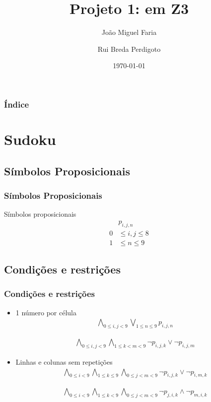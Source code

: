 \documentclass[a4paper,12pt]{beamer}
\title{Projeto 1: \sat em {Z3}}
\author{João Miguel Faria \and Rui Breda Perdigoto}
\date{\today}
\theoremstyle{definition}
\theoremstyle{theorem}
\theoremstyle{remark}
\begin{document}
\begin{frame}
   \titlepage
\end{frame}

\begin{frame}
   \frametitle{Índice}
   \tableofcontents%
\end{frame}

\section{Sudoku}

\subsection{Símbolos Proposicionais}
\begin{frame}
\frametitle{Símbolos Proposicionais}
Símbolos proposicionais 
   \begin{align*}
      &p_{i,j,n}\\
      0&\leq i, j \leq 8\\
      1&\leq n \leq 9
   \end{align*}
\end{frame}

\subsection{Condições e restrições}
\begin{frame}
\frametitle{Condições e restrições}
\begin{itemize}
     \item 1 número por célula
        \begin{align}
        \bigwedge_{0\leq i,j < 9}
           \bigvee_{1\leq n \leq 9} p_{i,j,n}
        \end{align}
     
        \begin{align}
        \bigwedge_{0\leq i,j < 9}
           \bigwedge_{1\leq k < m < 9}
           {\lnot p_{i,j,k} \lor \lnot p_{i,j,m}}
        \end{align}
        \pause
      \item Linhas e colunas sem repetições
         \begin{align}
         \bigwedge_{0\leq i < 9} \bigwedge_{1\leq k \leq 9} \bigwedge_{0\leq j < m
         < 9} \lnot p_{i,j,k}
         \lor \lnot p_{i,m,k}
         \end{align}

         \begin{align}
         \bigwedge_{0\leq i < 9} \bigwedge_{1\leq k < 9} 
            \bigwedge_{0\leq j < m < 9}
               \lnot p_{j,i,k} \land \lnot p_{m,i,k}
         \end{align}
         
\end{itemize}
\end{frame}
\end{document}
